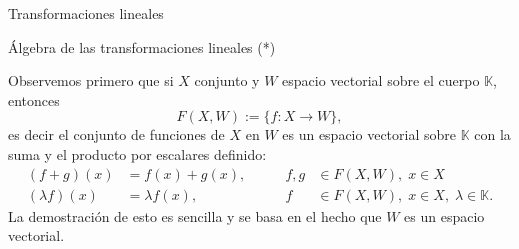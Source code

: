 \documentclass[a4paper,12pt,twoside,spanish,reqno]{amsbook}
\numberwithin{equation}{section}
\theoremstyle{definition}
\theoremstyle{remark}
\newcommand{\K}{\mathbb K}
\begin{document}
\begin{chapter}{Transformaciones lineales}
\begin{section}{Álgebra de las transformaciones lineales (*)}
            
            Observemos primero que si $X$ conjunto y $W$ espacio vectorial sobre el cuerpo $\K$,  entonces
            $$
            F(X,W) := \{f:X\to W\},
            $$ 
            es decir el conjunto de funciones de $X$ en $W$ es un espacio vectorial sobre $\K$ con la suma y el producto por escalares definido:
            \begin{equation*}
            \begin{array}{rlcl}
            (f+g)(x) &= f(x)+ g(x),\qquad &f,g& \in F(X,W),\; x \in X\\
            (\lambda f)(x) &= \lambda f(x), & f& \in F(X,W),\; x \in X, \; \lambda \in \K.
            \end{array}
            \end{equation*}
            La demostración de esto es sencilla y se basa en el hecho que $W$  es un espacio vectorial. 
            

\end{section}
\end{chapter}
\end{document}
